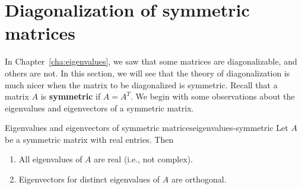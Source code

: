 \section{Diagonalization of symmetric matrices}

In Chapter~\ref{cha:eigenvalues}, we saw that some matrices are
diagonalizable, and others are not. In this section, we will see that
the theory of diagonalization is much nicer when the matrix to be
diagonalized is symmetric. Recall that a matrix $A$ is
\textbf{symmetric}%
%
 if $A=A^T$. We begin with some observations
about the eigenvalues and eigenvectors of a symmetric matrix.

\begin{proposition}{Eigenvalues and eigenvectors of symmetric matrices}{eigenvalues-symmetric}
  Let $A$ be a symmetric matrix with real entries. Then
  \begin{enumialphparenastyle}
    \begin{enumerate}
    \item All eigenvalues of $A$ are real (i.e., not complex).
    \item Eigenvectors for distinct eigenvalues of $A$ are orthogonal.
    \end{enumerate}
  \end{enumialphparenastyle}
\end{proposition}

